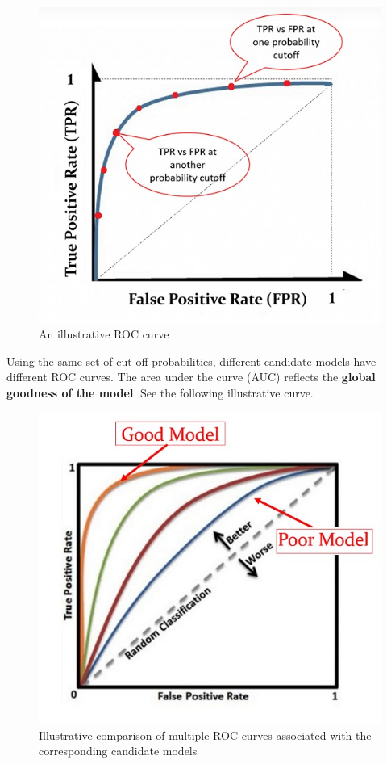 \documentclass[
]{book}
\begin{document}
\begin{figure}

{\centering \includegraphics[width=0.8\linewidth]{img08/w08-roc} 

}

\caption{An illustrative ROC curve}\label{fig:unnamed-chunk-129}
\end{figure}

Using the same set of cut-off probabilities, different candidate models have different ROC curves. The area under the curve (AUC) reflects the \textbf{global goodness of the model}. See the following illustrative curve.

\begin{figure}

{\centering \includegraphics[width=0.8\linewidth]{img08/w08-roc-2} 

}

\caption{Illustrative comparison of multiple ROC curves associated with the corresponding candidate models}\label{fig:unnamed-chunk-130}
\end{figure}
\end{document}
